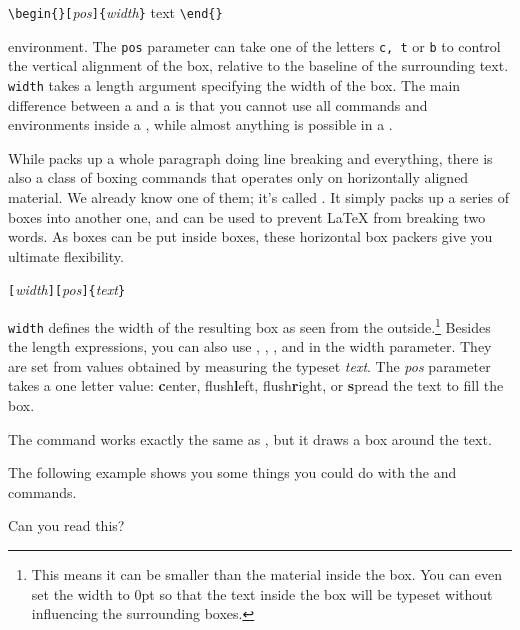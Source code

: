 \begin{lscommand}
\verb|\begin{|\verb|}[|\emph{pos}\verb|]{|\emph{width}\verb|}| text
\verb|\end{|\verb|}|
\end{lscommand}

\noindent environment. The \texttt{pos} parameter can take one of the letters
\texttt{c, t} or \texttt{b} to control the vertical alignment of the box,
relative to the baseline of the surrounding text. \texttt{width} takes
a length argument specifying the width of the box. The main difference
between a  and a  is that you cannot use all commands
and environments inside a , while almost anything is possible in
a .

While  packs up a whole paragraph doing line breaking and
everything, there is also a class of boxing commands that operates
only on horizontally aligned material. We already know one of them;
it's called . It simply packs up a series of boxes into
another one, and can be used to prevent \LaTeX{} from breaking two
words. As boxes can be put inside boxes, these horizontal box packers
give you ultimate flexibility.

\begin{lscommand}
\verb|[|\emph{width}\verb|][|\emph{pos}\verb|]{|\emph{text}\verb|}|
\end{lscommand}

\noindent \texttt{width} defines the width of the resulting box as
seen from the outside.\footnote{This means it can be smaller than the
material inside the box. You can even set the
width to 0pt so that the text inside the box will be typeset without
influencing the surrounding boxes.}  Besides the length
expressions, you can also use , , , and
 in the width parameter. They are set from values
obtained by measuring the typeset \emph{text}. The \emph{pos} parameter takes
a one letter value: \textbf{c}enter, flush\textbf{l}eft,
flush\textbf{r}ight, or \textbf{s}pread the text to fill the box.

The command  works exactly the same as , but
it draws a box around the text.

The following example shows you some things you could do with
the  and  commands.

\begin{example}
\par
{}\par
{} \par
{} \par
{}
Can you read this?
\end{example}

